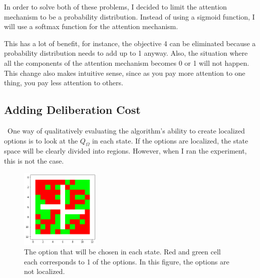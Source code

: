 \documentclass{article}
\begin{document}
	\quad In order to solve both of these problems, I decided to limit the attention mechanism to be a probability distribution. Instead of using a sigmoid function, I will use a softmax function for the attention mechanism.
	
	\quad This has a lot of benefit, for instance, the objective 4 can be eliminated because a probability distribution needs to add up to 1 anyway. Also, the situation where all the components of the attention mechanism becomes 0 or 1 will not happen. This change also makes intuitive sense, since as you pay more attention to one thing, you pay less attention to others.
	\subsection*{Adding Deliberation Cost}
	\qquad \ One way of qualitatively evaluating the algorithm's ability to create localized options is to look at the $Q_\Omega$ in each state. If the options are localized, the state space will be clearly divided into regions. However, when I ran the experiment, this is not the case.
	\begin{figure}[h]
		\centering
		\includegraphics[width=1.5in]{noDC.png}
		\caption{The option that will be chosen in each state. Red and green cell each corresponds to 1 of the options. In this figure, the options are not localized.}
	\end{figure}
\end{document}
